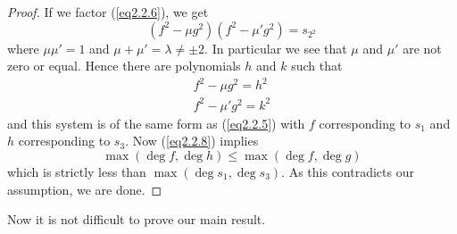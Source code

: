 \begin{proof}
If we factor (\ref{eq2.2.6}), we get
\begin{equation}
\label{eq2.2.7}
(f^{2}-\mu g^{2})(f^{2}-\mu'g^{2})=s_{2^{2}}
\end{equation}
where $\mu\mu'=1$ and $\mu+\mu'=\lambda\neq\pm 2$. In particular we see that $\mu$ and $\mu'$ are not zero or equal. Hence there are polynomials $h$ and $k$ such that
\begin{equation}
\label{eq2.2.8}
\begin{split}
f^{2}-\mu g^{2}=h^{2}\\
f^{2}-\mu'g^{2}=k^{2}
\end{split}
\end{equation}
and this system is of the same form as (\ref{eq2.2.5}) with $f$ corresponding to $s_{1}$ and $h$ corresponding to $s_3$. Now (\ref{eq2.2.8}) implies
$$
\max(\deg f,\deg h)\leq\max(\deg f,\deg g)
$$
which is strictly less than $\max(\deg s_{1},\deg s_{3})$. As this contradicts our assumption, we are done.
\end{proof}

Now it is not difficult to prove our main result.

